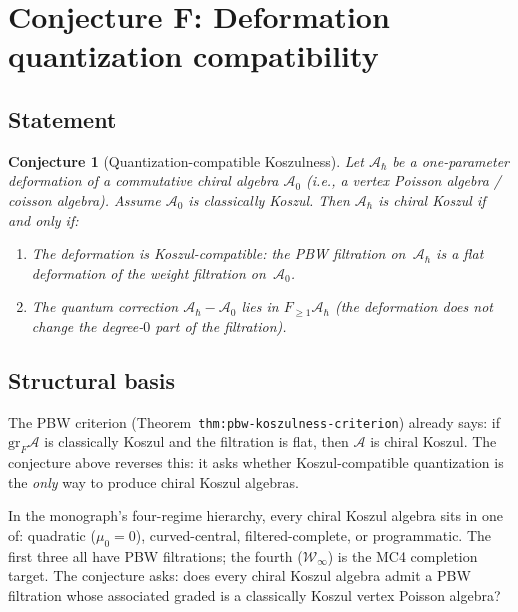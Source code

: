\documentclass[11pt]{article}
\newcommand{\cA}{\mathcal{A}}
\newcommand{\gr}{\mathrm{gr}}
\theoremstyle{plain}
\newtheorem{conjecture}{Conjecture}[section]
\theoremstyle{definition}
\theoremstyle{remark}
\begin{document}
\section{Conjecture F: Deformation quantization compatibility}
\label{sec:dq}

\subsection{Statement}

\begin{conjecture}[Quantization-compatible Koszulness]
\label{conj:dq}
Let $\cA_\hbar$ be a one-parameter deformation of a commutative
chiral algebra $\cA_0$ (i.e., a vertex Poisson algebra / coisson
algebra).  Assume $\cA_0$ is classically Koszul.  Then $\cA_\hbar$
is chiral Koszul if and only if:
\begin{enumerate}[label=(\roman*)]
\item The deformation is \emph{Koszul-compatible}: the PBW
  filtration on~$\cA_\hbar$ is a flat deformation of the weight
  filtration on~$\cA_0$.
\item The quantum correction $\cA_\hbar - \cA_0$ lies in
  $F_{\geq 1}\cA_\hbar$ (the deformation does not change the
  degree-$0$ part of the filtration).
\end{enumerate}
\end{conjecture}

\subsection{Structural basis}

The PBW criterion (Theorem~\texttt{thm:pbw-koszulness-criterion})
already says: if $\gr_F\cA$ is classically Koszul and the
filtration is flat, then $\cA$ is chiral Koszul.  The conjecture
above reverses this: it asks whether Koszul-compatible quantization
is the \emph{only} way to produce chiral Koszul algebras.

In the monograph's four-regime hierarchy, every chiral Koszul
algebra sits in one of: quadratic ($\mu_0 = 0$), curved-central,
filtered-complete, or programmatic.  The first three all have
PBW filtrations; the fourth ($\mathcal{W}_\infty$) is the MC4
completion target.  The conjecture asks: does every chiral Koszul
algebra admit a PBW filtration whose associated graded is a
classically Koszul vertex Poisson algebra?
\end{document}
